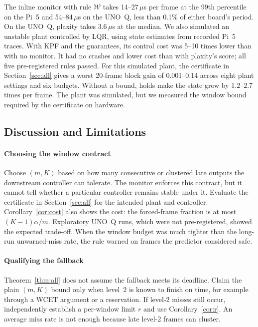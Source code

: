 \documentclass[acmsmall,screen]{acmart}
\newcommand{\Wl}{$\mathcal{W}$}
\begin{document}
The inline monitor with rule \Wl{} takes 14--27\,$\mu$s per frame at the 99th percentile on the Pi~5 and 54--84\,$\mu$s on the UNO~Q, less than 0.1\% of either board's period. On the UNO~Q, plaxity takes 3.6\,$\mu$s at the median. We also simulated an unstable plant controlled by LQR, using state estimates from recorded Pi~5 traces. With KPF and the guarantees, its control cost was 5--10 times lower than with no monitor. It had no crashes and lower cost than with plaxity's score; all five pre-registered rules passed. For this simulated plant, the certificate in Section~\ref{sec:all} gives a worst 20-frame block gain of 0.001--0.14 across eight plant settings and six budgets. Without a bound, holds make the state grow by 1.2--2.7 times per frame. The plant was simulated, but we measured the window bound required by the certificate on hardware.

\subsection{Discussion and Limitations}\label{sec:eval-disc}

\paragraph{Choosing the window contract} Choose $(m,K)$ based on how many consecutive or clustered late outputs the downstream controller can tolerate. The monitor enforces this contract, but it cannot tell whether a particular controller remains stable under it. Evaluate the certificate in Section~\ref{sec:all} for the intended plant and controller. Corollary~\ref{cor:cost} also shows the cost: the forced-frame fraction is at most $(K-1)\alpha/m$. Exploratory UNO~Q runs, which were not pre-registered, showed the expected trade-off. When the window budget was much tighter than the long-run unwarned-miss rate, the rule warned on frames the predictor considered safe.

\paragraph{Qualifying the fallback} Theorem~\ref{thm:all} does not assume the fallback meets its deadline. Claim the plain $(m,K)$ bound only when level~2 is known to finish on time, for example through a WCET argument or a reservation. If level-2 misses still occur, independently establish a per-window limit $r$ and use Corollary~\ref{cor:r}. An average miss rate is not enough because late level-2 frames can cluster.
\end{document}
